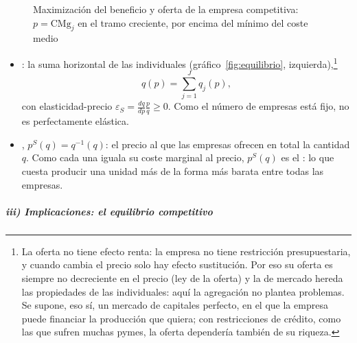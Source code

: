 \documentclass[11pt]{article}
\begin{document}
\begin{figure}[H]
\centering
\caption{Maximización del beneficio y oferta de la empresa competitiva: $p=\mathrm{CMg}_j$ en el tramo creciente, por encima del mínimo del coste medio}\label{fig:oferta-empresa}
\end{figure}

\begin{itemize}
\item {}: la suma horizontal de las individuales (gráfico~\ref{fig:equilibrio}, izquierda),\footnote{La oferta no tiene efecto renta: la empresa no tiene restricción presupuestaria, y cuando cambia el precio solo hay efecto sustitución. Por eso su oferta es siempre no decreciente en el precio (ley de la oferta)  y la de mercado hereda las propiedades de las individuales: aquí la agregación no plantea problemas. Se supone, eso sí, un mercado de capitales perfecto, en el que la empresa puede financiar la producción que quiera; con restricciones de crédito, como las que sufren muchas pymes, la oferta dependería también de su riqueza.}
  \begin{equation}
  q(p)=\sum_{j=1}^{J}q_j(p), \label{eq:oferta-mercado}
  \end{equation}
  con elasticidad-precio $\varepsilon_S=\frac{dq}{dp}\frac{p}{q}\geq 0$. Como el número de empresas está fijo, no es perfectamente elástica.
\item {}, $p^S(q)=q^{-1}(q)$: el precio al que las empresas ofrecen en total la cantidad $q$. Como cada una iguala su coste marginal al precio, $p^S(q)$ es el : lo que cuesta producir una unidad más de la forma más barata entre todas las empresas.
\end{itemize}

\subparagraph{iii) Implicaciones: el equilibrio competitivo}
\end{document}
